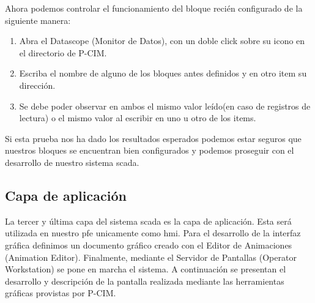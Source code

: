 Ahora podemos controlar el funcionamiento del bloque recién configurado de la 
siguiente manera:
\begin{enumerate}
  \item Abra el Datascope (Monitor de Datos), con un doble click sobre su icono 
  en el directorio de P-CIM.
  \item Escriba el nombre de alguno de los bloques antes definidos  y en otro 
  item su dirección.
  \item Se debe poder observar en ambos el mismo valor leído(en caso de 
  registros de lectura) o el mismo valor al escribir en uno u otro de los items.
\end{enumerate}
Si esta prueba nos ha dado los resultados esperados podemos estar seguros que 
nuestros bloques se encuentran bien configurados y podemos proseguir con el 
desarrollo de nuestro sistema \gls{scada}.


\subsection{Capa de aplicación}
\label{subsec:CapaAplicacion}
La tercer y última capa del sistema \gls{scada} es la capa de aplicación. Esta 
será utilizada en nuestro \gls{pfe} unicamente como \gls{hmi}. Para el 
desarrollo de la interfaz gráfica definimos un documento gráfico creado con el 
Editor de Animaciones (Animation Editor). Finalmente, mediante el Servidor de 
Pantallas (Operator Workstation) se pone en marcha el sistema. A continuación se 
presentan el desarrollo y descripción de la pantalla realizada mediante las 
herramientas gráficas provistas por P-CIM.



